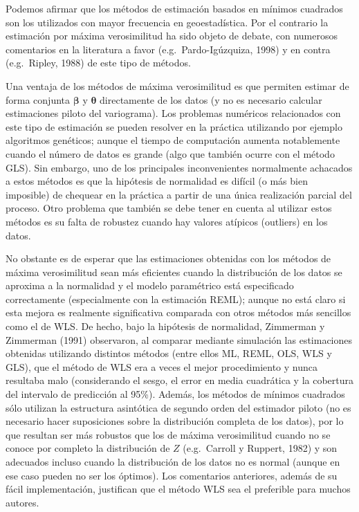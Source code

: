 \documentclass[
  spanish,
]{book}
\theoremstyle{break}
\theoremstyle{definition}
\theoremstyle{definition}
\theoremstyle{definition}
\theoremstyle{definition}
\theoremstyle{remark}
\begin{document}
Podemos afirmar que los métodos de estimación basados en mínimos cuadrados son los utilizados con mayor frecuencia en geoestadística.
Por el contrario la estimación por máxima verosimilitud ha sido objeto de debate, con numerosos comentarios en la literatura a favor (e.g.~Pardo-Igúzquiza, 1998) y en contra (e.g.~Ripley, 1988) de este tipo de métodos.

Una ventaja de los métodos de máxima verosimilitud es que permiten estimar de forma conjunta \(\boldsymbol{\beta}\) y \(\boldsymbol{\theta}\) directamente de los datos (y no es necesario calcular estimaciones piloto del variograma).
Los problemas numéricos relacionados con este tipo de estimación se pueden resolver en la práctica utilizando por ejemplo algoritmos genéticos;
aunque el tiempo de computación aumenta notablemente cuando el número de datos es grande (algo que también ocurre con el método GLS).
Sin embargo, uno de los principales inconvenientes normalmente achacados a estos métodos es que la hipótesis de normalidad es difícil (o más bien imposible) de chequear en la práctica a partir de una única realización parcial del proceso.
Otro problema que también se debe tener en cuenta al utilizar estos métodos es su falta de robustez cuando hay valores atípicos (outliers) en los datos.

No obstante es de esperar que las estimaciones obtenidas con los métodos de máxima verosimilitud sean más eficientes cuando la distribución de los datos se aproxima a la normalidad y el modelo paramétrico está especificado correctamente (especialmente con la estimación REML); aunque no está claro si esta mejora es realmente significativa comparada con otros métodos más sencillos como el de WLS.
De hecho, bajo la hipótesis de normalidad, Zimmerman y Zimmerman (1991) observaron, al comparar mediante simulación las estimaciones obtenidas utilizando
distintos métodos (entre ellos ML, REML, OLS, WLS y GLS), que el método de WLS era a veces el mejor procedimiento y nunca resultaba malo (considerando el sesgo, el error en media cuadrática y la cobertura del intervalo de predicción al 95\%).
Además, los métodos de mínimos cuadrados sólo utilizan la estructura asintótica de segundo orden del estimador piloto (no es necesario hacer suposiciones sobre la distribución completa de los datos), por lo que resultan ser más robustos que los de máxima verosimilitud cuando no se conoce por completo la distribución de \(Z\) (e.g.~Carroll y Ruppert, 1982) y son adecuados incluso cuando la distribución de los datos no es normal (aunque en ese caso pueden no ser los óptimos).
Los comentarios anteriores, además de su fácil implementación, justifican que el método WLS sea el preferible para muchos autores.
\end{document}

